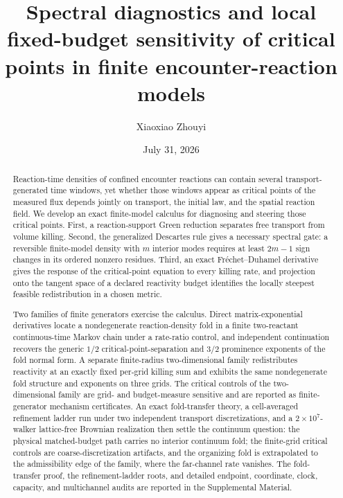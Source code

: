 \documentclass[aps,pre,reprint,amsmath,amssymb,longbibliography,floatfix]{revtex4-2}
\begin{document}
\title{Spectral diagnostics and local fixed-budget sensitivity of critical points in finite encounter-reaction models}

\author{Xiaoxiao Zhouyi}

\date{July 31, 2026}

\begin{abstract}
Reaction-time densities of confined encounter reactions can contain several
transport-generated time windows, yet whether those windows appear as
critical points of the measured flux depends jointly on transport, the
initial law, and the spatial reaction field. We develop an exact finite-model
calculus for diagnosing and steering those critical points. First, a
reaction-support Green reduction separates free transport from volume
killing. Second, the generalized Descartes rule gives a necessary spectral
gate: a reversible finite-model density with \(m\) interior modes requires at
least \(2m-1\) sign changes in its ordered nonzero residues. Third, an exact
Fr\'echet--Duhamel derivative gives the response of the critical-point
equation to every killing rate, and projection onto the tangent space of a
declared reactivity budget identifies the locally steepest feasible
redistribution in a chosen metric.

Two families of finite generators exercise the calculus. Direct
matrix-exponential derivatives locate a nondegenerate reaction-density fold
in a finite two-reactant continuous-time Markov chain under a rate-ratio
control, and independent continuation recovers the generic \(1/2\)
critical-point-separation and \(3/2\) prominence exponents of the fold
normal form. A separate finite-radius two-dimensional family redistributes
reactivity at an exactly fixed per-grid killing sum and exhibits the same
nondegenerate fold structure and exponents on three grids. The critical
controls of the two-dimensional family are grid- and budget-measure
sensitive and are reported as finite-generator mechanism certificates. An
exact fold-transfer theory, a cell-averaged refinement ladder run under two
independent transport discretizations, and a \(2\times10^7\)-walker
lattice-free Brownian realization then settle the continuum question: the
physical matched-budget path carries no interior continuum fold; the
finite-grid critical controls are coarse-discretization artifacts, and the
organizing fold is extrapolated to the admissibility edge of the family,
where the far-channel rate vanishes. The fold-transfer proof, the refinement-ladder roots, and detailed
endpoint, coordinate, clock, capacity, and multichannel audits are
reported in the Supplemental Material.
\end{abstract}
\end{document}

